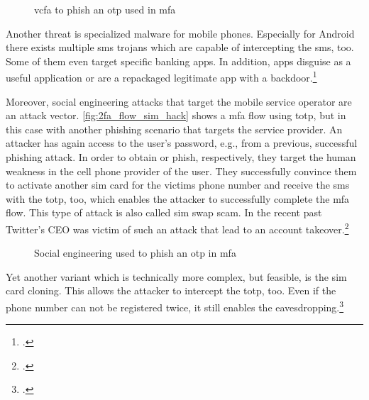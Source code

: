 \begin{figure}[hbt]
	\centering
	
	\caption[\gls{vcfa} to phish an \gls{otp} used in \gls{mfa}]{\gls{vcfa} to phish an \gls{otp} used in \gls{mfa}\footnotemark}
	\label{fig:2fa_flow_forward_phishing}
\end{figure}

Another threat is specialized malware for mobile phones. Especially for Android there exists multiple \gls{sms} trojans which are capable of intercepting the \gls{sms}, too. Some of them even target specific banking apps. In addition, apps disguise as a useful application or are a repackaged legitimate app with a backdoor.\footcites[See][146--149]{dmitrienko2014security}[See][152--154]{10.1007/978-3-642-39235-1_9}[See][114]{HAMED2017109}[See][]{eset-bypass2fa}

\newpage

Moreover, social engineering attacks that target the mobile service operator are an attack vector. \autoref{fig:2fa_flow_sim_hack} shows a \gls{mfa} flow using \gls{totp}, but in this case with another phishing scenario that targets the service provider. An attacker has again access to the user's password, e.g., from a previous, successful phishing attack. In order to obtain or phish, respectively, they target the human weakness in the cell phone provider of the user. They successfully convince them to activate another \gls{sim} card for the victims phone number and receive the \gls{sms} with the \gls{totp}, too, which enables the attacker to successfully complete the \gls{mfa} flow. This type of attack is also called \gls{sim} swap scam. In the recent past Twitter's CEO was victim of such an attack that lead to an account takeover.\footcite[See][]{twitter-hack}
\\
\begin{figure}[hbt]
	\centering
	
	\caption[Social engineering used to phish an \gls{otp} in \gls{mfa}]{Social engineering used to phish an \gls{otp} in \gls{mfa}\footnotemark}
	\label{fig:2fa_flow_sim_hack}
\end{figure}

Yet another variant which is technically more complex, but feasible, is the \gls{sim} card cloning. This allows the attacker to intercept the \gls{totp}, too. Even if the phone number can not be registered twice, it still enables the eavesdropping.\footcites[See][873]{eckert-it-sec-9}[See][11--12]{sim-clone}

